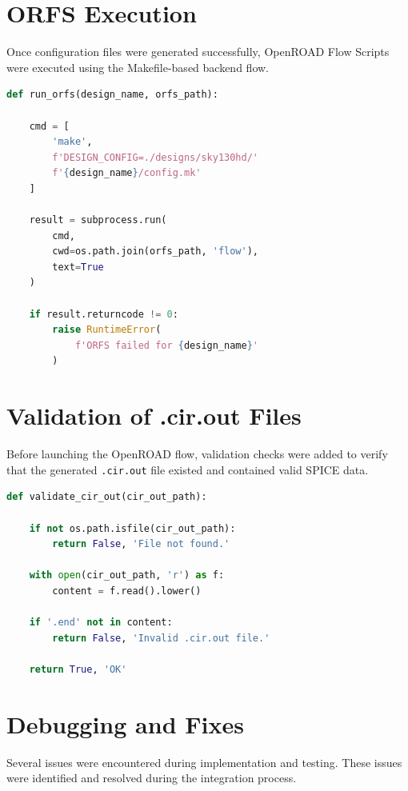 \section{ORFS Execution}

Once configuration files were generated successfully, OpenROAD Flow Scripts were executed using the Makefile-based backend flow.

\begin{lstlisting}[language=python,
caption={ORFS execution from OpenROAD.py.}]
def run_orfs(design_name, orfs_path):

    cmd = [
        'make',
        f'DESIGN_CONFIG=./designs/sky130hd/'
        f'{design_name}/config.mk'
    ]

    result = subprocess.run(
        cmd,
        cwd=os.path.join(orfs_path, 'flow'),
        text=True
    )

    if result.returncode != 0:
        raise RuntimeError(
            f'ORFS failed for {design_name}'
        )
\end{lstlisting}

\section{Validation of .cir.out Files}

Before launching the OpenROAD flow, validation checks were added to verify that the generated \texttt{.cir.out} file existed and contained valid SPICE data.

\begin{lstlisting}[language=python,
caption={Validation of .cir.out files.}]
def validate_cir_out(cir_out_path):

    if not os.path.isfile(cir_out_path):
        return False, 'File not found.'

    with open(cir_out_path, 'r') as f:
        content = f.read().lower()

    if '.end' not in content:
        return False, 'Invalid .cir.out file.'

    return True, 'OK'
\end{lstlisting}

\section{Debugging and Fixes}

Several issues were encountered during implementation and testing. These issues were identified and resolved during the integration process.

